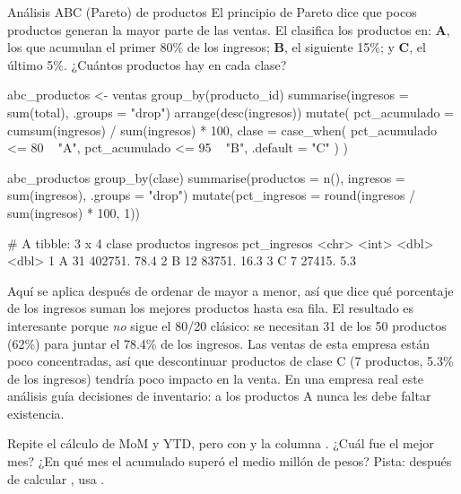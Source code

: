 \begin{ejemplo}{Análisis ABC (Pareto) de productos}
El principio de Pareto dice que pocos productos generan la mayor parte de las
ventas. El  clasifica los productos en: \textbf{A}, los
que acumulan el primer 80\% de los ingresos; \textbf{B}, el siguiente 15\%;
y \textbf{C}, el último 5\%. ¿Cuántos productos hay en cada clase?
\end{ejemplo}

\begin{rcode}
abc_productos <- ventas %
  group_by(producto_id) %
  summarise(ingresos = sum(total), .groups = "drop") %
  arrange(desc(ingresos)) %
  mutate(
    pct_acumulado = cumsum(ingresos) / sum(ingresos) * 100,
    clase = case_when(
      pct_acumulado <= 80 ~ "A",
      pct_acumulado <= 95 ~ "B",
      .default            = "C"
    )
  )

abc_productos %
  group_by(clase) %
  summarise(productos = n(), ingresos = sum(ingresos),
            .groups = "drop") %
  mutate(pct_ingresos = round(ingresos / sum(ingresos) * 100, 1))
\end{rcode}
\begin{rsalida}
# A tibble: 3 x 4
  clase productos ingresos pct_ingresos
  <chr>     <int>    <dbl>        <dbl>
1 A            31  402751.         78.4
2 B            12   83751.         16.3
3 C             7   27415.          5.3
\end{rsalida}

Aquí  se aplica después de ordenar de mayor a menor, así que
 dice qué porcentaje de los ingresos suman los
mejores productos hasta esa fila. El resultado es interesante porque
\emph{no} sigue el 80/20 clásico: se necesitan 31 de los 50 productos (62\%)
para juntar el 78.4\% de los ingresos. Las ventas de esta empresa están
poco concentradas, así que descontinuar productos de clase C (7 productos,
5.3\% de los ingresos) tendría poco impacto en la venta. En una empresa real
este análisis guía decisiones de inventario: a los productos A nunca les
debe faltar existencia.

\begin{hazlotu}
Repite el cálculo de MoM y YTD, pero con  y la columna
. ¿Cuál fue el mejor mes? ¿En qué mes el
acumulado superó el medio millón de pesos? Pista: después de calcular
, usa .
\end{hazlotu}

